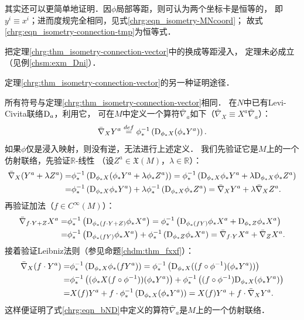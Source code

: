 \begin{remark}
    其实还可以更简单地证明．因$\phi$局部等距，则可认为两个坐标卡是恒等的，
    即$y^i\equiv x^i$；进而度规完全相同，见式\eqref{chrg:eqn_isometry-MNcoord}；
    故式\eqref{chrg:eqn_isometry-connection-tmp}为恒等式．
\end{remark}

\begin{remark}
    把定理\ref{chrg:thm_isometry-connection-vector}中的换成等距浸入，
    定理未必成立（见例\ref{chsm:exm_Dni}）．
\end{remark}

\begin{example}
	定理\ref{chrg:thm_isometry-connection-vector}的另一种证明途径．
\end{example}
所有符号与定理\ref{chrg:thm_isometry-connection-vector}相同．
在$N$中已有Levi-Civita联络${\rm D}_a$，利用它，
可在$M$中定义一个算符$\bar{\nabla}_a$如下（$\bar{\nabla}_X \equiv X^a\bar{\nabla}_a $）：
\begin{equation}\label{chrg:eqn_bND}
	\bar{\nabla}_X Y^a \overset{def}{=} \phi^{-1}_* \left( {\rm D}_{\phi_* X} (\phi_*Y^a) \right).
\end{equation}
如果$\phi$仅是浸入映射，则没有逆，无法进行上述定义．
我们先验证它是$M$上的一个仿射联络，先验证$\mathbb{R}$-线性
（设$Z^a \in \mathfrak{X}(M)$，$\lambda \in \mathbb{R}$）：
\begin{align*}
	\bar{\nabla}_X (Y^a + \lambda Z^a) =& \phi^{-1}_* \left( {\rm D}_{\phi_* X} (\phi_*Y^a +\lambda \phi_*Z^a)\right)
	= \phi^{-1}_* \left( {\rm D}_{\phi_* X}\phi_*Y^a +\lambda  {\rm D}_{\phi_* X} \phi_*Z^a\right)\\
	=& \phi^{-1}_* \left( {\rm D}_{\phi_* X}\phi_*Y^a\right) +\lambda  \phi^{-1}_* \left({\rm D}_{\phi_* X} \phi_*Z^a\right)
	=  \bar{\nabla}_X Y^a  + \lambda  \bar{\nabla}_X Z^a .
\end{align*}
再验证加法（$f\in C^\infty(M)$）：
\begin{align*}
	\bar{\nabla}_{f\cdot Y + Z} X^a =& \phi^{-1}_* \left( {\rm D}_{\phi_* (f\cdot Y+Z)} \phi_*X^a\right)
	=\phi^{-1}_* \left( {\rm D}_{\phi_* (f Y)} \phi_*X^a+ {\rm D}_{\phi_*Z} \phi_*X^a\right)\\
	=&\phi^{-1}_* \left( {\rm D}_{\phi_* (f Y)} \phi_*X^a\right)+\phi^{-1}_* \left( {\rm D}_{\phi_*Z} \phi_*X^a\right)
	=   \bar{\nabla}_{f\cdot Y } X^a  +\bar{\nabla}_{ Z} X^a .
\end{align*}
接着验证Leibniz法则（参见命题\ref{chdm:thm_fxxf}）：
\begin{align*}
	\bar{\nabla}_X (f\cdot Y^a ) =& \phi^{-1}_* \left( {\rm D}_{\phi_* X} \phi_* (fY^a) \right)
	= \phi^{-1}_* \left( {\rm D}_{\phi_* X} ((f\circ \phi^{-1})(\phi_* Y^a) )\right) \\
	=& \phi^{-1}_* \left(({\phi_* X} (f\circ \phi^{-1})) (\phi_* Y^a)\right) + 
	\phi^{-1}_* \left((f\circ \phi^{-1}) {\rm D}_{\phi_* X} (\phi_* Y^a )\right)  \\
	=& X(f) Y^a  +   f\cdot \phi^{-1}_* \left({\rm D}_{\phi_* X} (\phi_* Y^a )\right)  
	= X(f) Y^a  +   f\cdot \bar{\nabla}_X Y^a  . 
\end{align*}
这样便证明了式\eqref{chrg:eqn_bND}中定义的算符$\bar{\nabla}_a$是$M$上的一个仿射联络．

